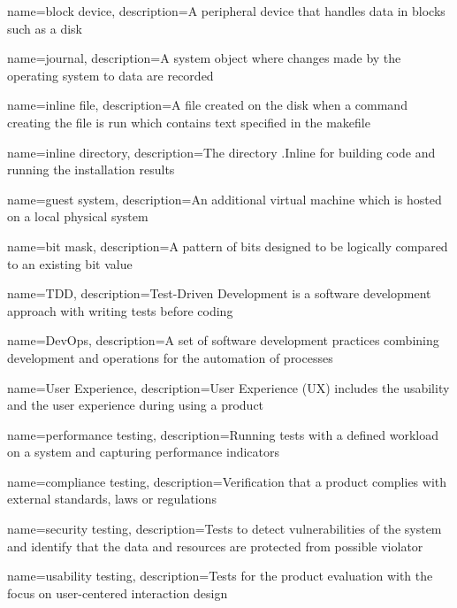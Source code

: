 {
    name={block device},
    description={A peripheral device that handles data in blocks such as a disk}
}

{
    name={journal},
    description={A system object where changes made by the operating system to data are recorded}
}

{
    name={inline file},
    description={A file created on the disk when a command creating the file is run which contains text specified in the makefile}
}

{
    name={inline directory},
    description={The directory .Inline for building code and running the installation results}
}

{
    name={guest system},
    description={An additional virtual machine which is hosted on a local physical system}
}

{
    name={bit mask},
    description={A pattern of bits designed to be logically compared to an existing bit value}
}

{
    name={TDD},
    description={Test-Driven Development is a software development approach with writing tests before coding}
}

{
    name={DevOps},
    description={A set of software development practices combining development and operations for the automation of processes}
}

{
    name={User Experience},
    description={User Experience (UX) includes the usability and the user experience during using a product}
}

{
    name={performance testing},
    description={Running tests with a defined workload on a system and capturing performance indicators}
}

{
    name={compliance testing},
    description={Verification that a product complies with external standards, laws or regulations}
}

{
    name={security testing},
    description={Tests to detect vulnerabilities of the system and identify that the data and resources are protected from possible violator}
}

{
    name={usability testing},
    description={Tests for the product evaluation with the focus on user-centered interaction design}
}

